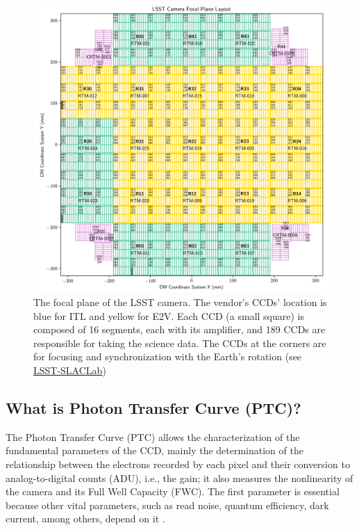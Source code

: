 \begin{figure}[!htb]
    \centering
    \includegraphics[width=\textwidth]{Figures/FP_layout_DM.png}
    \caption{The focal plane of the LSST camera. The vendor's CCDs' location is blue for ITL and yellow for E2V. Each CCD (a small square) is composed of 16 segments, each with its amplifier, and 189 CCDs are responsible for taking the science data. The CCDs at the corners are for focusing and synchronization with the Earth's rotation (see \href{https://www6.slac.stanford.edu/news/2020-09-08-sensors-world-largest-digital-camera-snap-first-3200-megapixel-images-slac.aspx}{LSST-SLACLab})}
    \label{fig:FP_LSSTCam}
\end{figure}

\subsection{What is Photon Transfer Curve (PTC)?}

The Photon Transfer Curve (PTC) allows the characterization of the fundamental parameters of the CCD, mainly the determination of the relationship between the electrons recorded by each pixel and their conversion to analog-to-digital counts (ADU), i.e., the gain; it also measures the nonlinearity of the camera and its Full Well Capacity (FWC). The first parameter is essential because other vital parameters, such as read noise, quantum efficiency, dark current, among others, depend on it \citep{downing2006ccd}.

